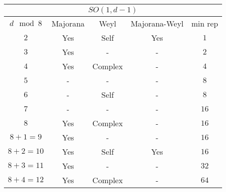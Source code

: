 \begin{tabular}{|ccccc|}
    \hline
    \multicolumn{5}{|c|}{$SO(1,d-1)$}                                                                                                              \\ \hline
    \multicolumn{1}{|c|}{$d \mod 8$} & \multicolumn{1}{c|}{Majorana} & \multicolumn{1}{c|}{Weyl}    & \multicolumn{1}{c|}{Majorana-Weyl} & min rep \\ \hline
    \multicolumn{1}{|c|}{$2$}        & \multicolumn{1}{c|}{Yes}      & \multicolumn{1}{c|}{Self}    & \multicolumn{1}{c|}{Yes}           & $1$     \\ \hline
    \multicolumn{1}{|c|}{$3$}        & \multicolumn{1}{c|}{Yes}      & \multicolumn{1}{c|}{-}       & \multicolumn{1}{c|}{-}             & $2$     \\ \hline
    \multicolumn{1}{|c|}{$4$}        & \multicolumn{1}{c|}{Yes}      & \multicolumn{1}{c|}{Complex} & \multicolumn{1}{c|}{-}             & $4$     \\ \hline
    \multicolumn{1}{|c|}{$5$}        & \multicolumn{1}{c|}{-}        & \multicolumn{1}{c|}{-}       & \multicolumn{1}{c|}{-}             & $8$     \\ \hline
    \multicolumn{1}{|c|}{$6$}        & \multicolumn{1}{c|}{-}        & \multicolumn{1}{c|}{Self}    & \multicolumn{1}{c|}{-}             & $8$     \\ \hline
    \multicolumn{1}{|c|}{$7$}        & \multicolumn{1}{c|}{-}        & \multicolumn{1}{c|}{-}       & \multicolumn{1}{c|}{-}             & $16$    \\ \hline
    \multicolumn{1}{|c|}{$8$}        & \multicolumn{1}{c|}{Yes}      & \multicolumn{1}{c|}{Complex} & \multicolumn{1}{c|}{-}             & $16$    \\ \hline
    \multicolumn{1}{|c|}{$8+1 = 9$}  & \multicolumn{1}{c|}{Yes}      & \multicolumn{1}{c|}{-}       & \multicolumn{1}{c|}{-}             & $16$    \\ \hline
    \multicolumn{1}{|c|}{$8+2=10$}   & \multicolumn{1}{c|}{Yes}      & \multicolumn{1}{c|}{Self}    & \multicolumn{1}{c|}{Yes}           & $16$    \\ \hline
    \multicolumn{1}{|c|}{$8+3=11$}   & \multicolumn{1}{c|}{Yes}      & \multicolumn{1}{c|}{-}       & \multicolumn{1}{c|}{-}             & $32$    \\ \hline
    \multicolumn{1}{|c|}{$8+4=12$}   & \multicolumn{1}{c|}{Yes}      & \multicolumn{1}{c|}{Complex} & \multicolumn{1}{c|}{-}             & $64$    \\ \hline
    \end{tabular}